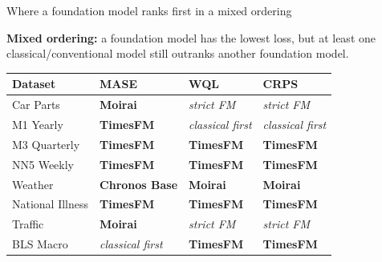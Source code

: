 \documentclass[aspectratio=169,10pt]{beamer}
\begin{document}
\begin{frame}{Where a foundation model ranks first in a mixed ordering}
  \vspace{0.02cm}
  \begin{center}
    \small
    \colorbox{PurpleLight}{\parbox{0.89\linewidth}{\centering
      \textbf{Mixed ordering:} a foundation model has the lowest loss, but at
      least one classical/conventional model still outranks another foundation
      model.}}
  \end{center}

  \vspace{0.16cm}
  \begin{center}
    \fontsize{7.7}{8.9}\selectfont
    \renewcommand{\arraystretch}{1.15}
    \setlength{\tabcolsep}{5pt}
    \begin{tabular}{L{2.85cm} C{3.20cm} C{3.20cm} C{3.20cm}}
      \toprule
      \textbf{Dataset} & \textbf{MASE} & \textbf{WQL} & \textbf{CRPS} \\
      \midrule
      Car Parts & \textbf{Moirai} & \textit{strict FM} & \textit{strict FM} \\
       M1 Yearly & \textbf{TimesFM} & \textit{classical first} & \textit{classical first} \\
      M3 Quarterly & \textbf{TimesFM} & \textbf{TimesFM} & \textbf{TimesFM} \\
       NN5 Weekly & \textbf{TimesFM} & \textbf{TimesFM} & \textbf{TimesFM} \\
      Weather & \textbf{Chronos Base} & \textbf{Moirai} & \textbf{Moirai} \\
       National Illness & \textbf{TimesFM} & \textbf{TimesFM} & \textbf{TimesFM} \\
      Traffic & \textbf{Moirai} & \textit{strict FM} & \textit{strict FM} \\
       BLS Macro & \textit{classical first} & \textbf{TimesFM} & \textbf{TimesFM} \\
      \bottomrule
    \end{tabular}
  \end{center}


\end{frame}
\end{document}
